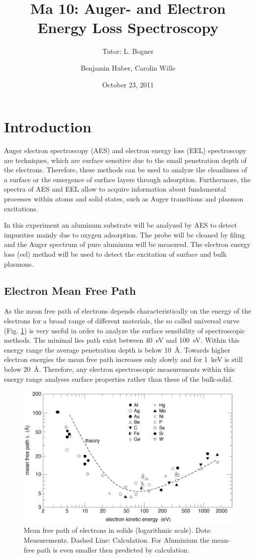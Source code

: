 \documentclass[a4paper]{scrartcl}
\title{Ma 10: Auger- and Electron Energy Loss Spectroscopy}
\subtitle{Tutor: L. Bogner}
\author{Benjamin Huber, Carolin Wille}
\date{October 23, 2011}
\numberwithin{equation}{section}
\numberwithin{figure}{section}
\numberwithin{table}{section}
\begin{document}
\thispagestyle{empty}
\maketitle
\tableofcontents
\clearpage




\section{Introduction}
Auger electron spectroscopy (AES) and electron energy loss (EEL) spectroscopy are techniques, which are surface sensitive due to the small penetration depth of the electrons. Therefore, these methods can be used to analyze the cleanliness of a surface or the emergence of surface layers through adsorption. Furthermore, the spectra of AES and EEL allow to acquire information about fundamental processes within atoms and solid states, such as Auger transitions and plasmon excitations.  

In this experiment an aluminum substrate will be analyzed by AES to detect impurities mainly due to oxygen adsorption. The probe will be cleaned by filing and the Auger spectrum of pure aluminum will be measured. The electron energy loss (eel) method will be used to detect the excitation of surface and bulk plasmons.


\subsection{Electron Mean Free Path}
As the mean free path of electrons depends characteristically on the energy of the electrons for a broad range of different materials, the so called universal curve (Fig. \ref{mf}) is very useful in order to analyze the surface sensibility of spectroscopic methods. The minimal lies path exist between \SI{40}{eV} and \SI{100}{eV}. Within this energy range the average penetration depth is below \SI{10}{\AA}. Towards higher electron energies the mean free path increases only slowly and for \SI{1}{keV} is still below \SI{20}{\AA}. Therefore, any electron spectroscopic measurements within this energy range analyses surface properties rather than these of the bulk-solid. 
\begin{figure}[htbp]
\centering
\includegraphics[width=0.5 \textwidth]{meanfree.pdf}
\caption{\small Mean free path of electrons in solids (logarithmic scale). Dots: Measurements. Dashed Line: Calculation. For Aluminium the mean-free path is even smaller then predicted by calculation. \cite{zangwill} }
\label{mf}
\end{figure}
\end{document}
